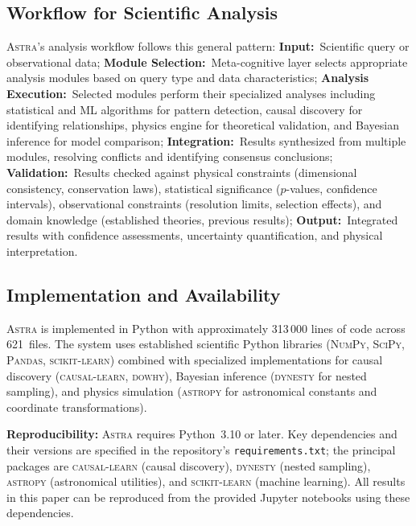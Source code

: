\documentclass[usenatbib]{rasti}
\newcommand{\astra}{\textsc{Astra}\xspace}
\begin{document}
\subsection{Workflow for Scientific Analysis}
\label{sec:methods:workflow}

\astra's analysis workflow follows this general pattern:
\textbf{Input:}~Scientific query or observational data;
\textbf{Module Selection:}~Meta-cognitive layer selects appropriate analysis modules based on query type and data characteristics;
\textbf{Analysis Execution:}~Selected modules perform their specialized analyses including statistical and ML algorithms for pattern detection, causal discovery for identifying relationships, physics engine for theoretical validation, and Bayesian inference for model comparison;
\textbf{Integration:}~Results synthesized from multiple modules, resolving conflicts and identifying consensus conclusions;
\textbf{Validation:}~Results checked against physical constraints (dimensional consistency, conservation laws), statistical significance ($p$-values, confidence intervals), observational constraints (resolution limits, selection effects), and domain knowledge (established theories, previous results);
\textbf{Output:}~Integrated results with confidence assessments, uncertainty quantification, and physical interpretation.

\subsection{Implementation and Availability}
\label{sec:methods:implementation}

\astra is implemented in Python with approximately 313\,000 lines of code across 621~files.
The system uses established scientific Python libraries (\textsc{NumPy}, \textsc{SciPy}, \textsc{Pandas}, \textsc{scikit-learn}) combined with specialized implementations for causal discovery (\textsc{causal-learn}, \textsc{dowhy}), Bayesian inference (\textsc{dynesty} for nested sampling), and physics simulation (\textsc{astropy} for astronomical constants and coordinate transformations).

\textbf{Reproducibility:}
\astra requires Python~3.10 or later.
Key dependencies and their versions are specified in the repository's \texttt{requirements.txt}; the principal packages are \textsc{causal-learn} (causal discovery), \textsc{dynesty} (nested sampling), \textsc{astropy} (astronomical utilities), and \textsc{scikit-learn} (machine learning).
All results in this paper can be reproduced from the provided Jupyter notebooks using these dependencies.
\end{document}
